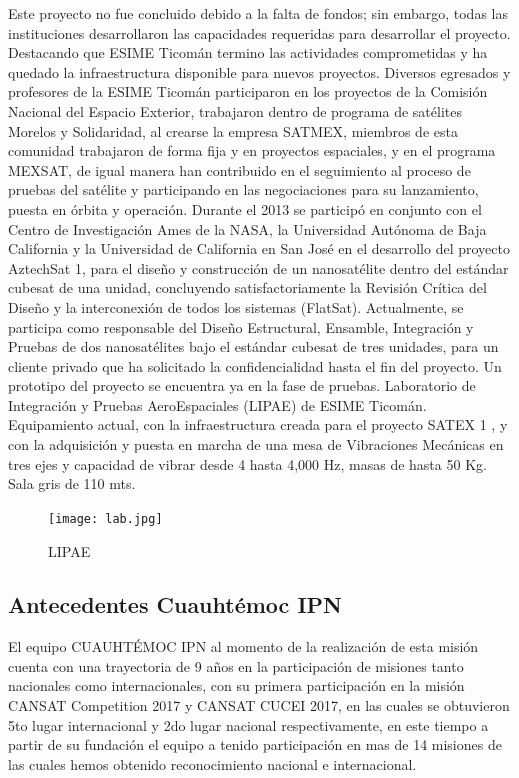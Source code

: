 \documentclass[letterpaper,12pt]{article} %
\begin{document}
Este proyecto no fue concluido debido a la falta de fondos; sin embargo, todas las instituciones desarrollaron las capacidades requeridas para desarrollar el proyecto. Destacando que ESIME Ticomán termino las actividades comprometidas y ha quedado la infraestructura disponible para nuevos proyectos.
Diversos egresados y profesores de la ESIME Ticomán participaron en los proyectos de la Comisión Nacional del Espacio Exterior, trabajaron dentro de programa de satélites Morelos y Solidaridad, al crearse la empresa SATMEX, miembros de esta comunidad trabajaron de forma fija y en proyectos espaciales, y en el programa MEXSAT, de igual manera han contribuido en el seguimiento al proceso de pruebas del satélite y participando en las negociaciones para su lanzamiento, puesta en órbita y operación.
Durante el 2013 se participó en conjunto con el Centro de Investigación Ames de la NASA, la Universidad Autónoma de Baja California y la Universidad de California en San José en el desarrollo del proyecto AztechSat 1, para el diseño y construcción de un nanosatélite dentro del estándar cubesat de una unidad, concluyendo satisfactoriamente la Revisión Crítica del Diseño y la interconexión de todos los sistemas (FlatSat).
Actualmente, se participa como responsable del Diseño Estructural, Ensamble, Integración y Pruebas de dos nanosatélites bajo el estándar cubesat de tres unidades, para un cliente privado que ha solicitado la confidencialidad hasta el fin del proyecto. Un prototipo del proyecto se encuentra ya en la fase de pruebas.
Laboratorio de Integración y Pruebas AeroEspaciales (LIPAE) de ESIME Ticomán. Equipamiento actual, con la infraestructura creada para el proyecto SATEX 1 , y con la adquisición y puesta en marcha de una mesa de Vibraciones Mecánicas  en tres ejes y capacidad de vibrar desde 4 hasta 4,000 Hz, masas de hasta 50 Kg. Sala gris de 110 mts.

\begin{figure}[H]
      \centerline{\texttt{[image: lab.jpg]}}
      \caption{LIPAE}
      \label{fig:LAB}
    \end{figure}

\newpage
    \subsection{Antecedentes Cuauhtémoc IPN}

    El equipo CUAUHTÉMOC IPN al momento de la realización de esta misión cuenta con una trayectoria de 9 años en la 
    participación de misiones tanto nacionales como internacionales, con su primera participación en la misión CANSAT Competition 
    2017 y CANSAT CUCEI 2017, en las cuales se obtuvieron 5to lugar internacional y 2do lugar nacional respectivamente, en este tiempo
    a partir de su fundación el equipo a tenido participación en mas de 14 misiones de las cuales hemos obtenido reconocimiento nacional e 
    internacional.
    
\end{document}
